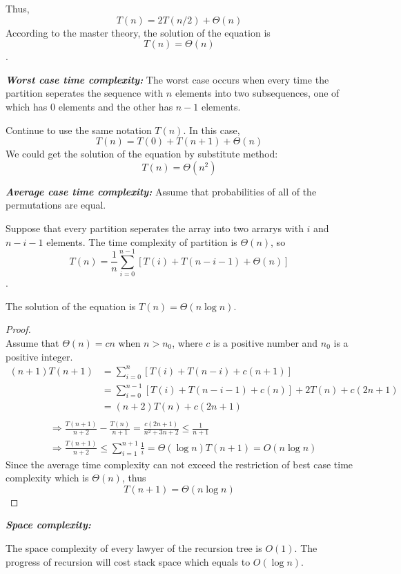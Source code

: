 \documentclass[12pt,a4paper]{article}
\theoremstyle{definition}
\begin{document}
\begin{enumerate}
\begin{enumerate}
Thus, 
$$T(n)=2T(n/2)+\Theta(n)$$ 
According to the master theory, the solution of the equation is $$T(n)=\Theta(n)$$.


\textbf{\textit{Worst case time complexity:}} The worst  case occurs when every time the partition seperates the sequence with $n$ elements into two subsequences, one of which has $0$ elements and the other has $n-1$ elements.

Continue to use the same notation $T(n)$. In this case, 
$$T(n)=T(0)+T(n+1)+\Theta(n)$$
We could get the solution of the equation by substitute method:
$$T(n)=\Theta(n^2)$$

\textbf{\textit{Average case time complexity:}} 
Assume that probabilities of all of the permutations are equal.

Suppose that every partition seperates the array into two arrarys with $i$ and $n-i-1$ elements. The time complexity of partition is $\Theta(n)$, so 
$$T(n)=\frac{1}{n} \sum_{i=0}^{n-1} [T(i)+T(n-i-1)+\Theta(n)]$$.

The solution of the equation is $T(n)=\Theta(n \log n)$.

\begin{proof}~\\
Assume that $\Theta(n)=cn$ when $n>n_0$, where $c$ is a positive number and $n_0$ is a positive integer.
		\begin{align}
       (n+1)T(n+1) &=\sum_{i=0}^{n} [T(i)+T(n-i)+c(n+1)]\\
       & = \sum_{i=0}^{n-1}[T(i)+T(n-i-1)+c(n)]+2T(n)+c(2n+1)\\
       & = (n+2)T(n)+c(2n+1)\\
        \end{align}
       \begin{equation}
       \begin{split}
      & \Rightarrow
       \frac{T(n+1)}{n+2}-\frac{T(n)}{n+1}=\frac{c(2n+1)}{n^2+3n+2}\leq \frac{1}{n+1}
       \\
      & \Rightarrow
       \frac{T(n+1)}{n+2}\leq \sum_{i=1}^{n+1} \frac{1}{i} =\Theta(\log n)
       T(n+1)=O(n\log n)
	   \end{split}       
       \end{equation}
      Since the average time complexity can not exceed the restriction of best case time complexity which is $\Theta(n)$, thus$$T(n+1)=\Theta(n\log n)$$\end{proof}
\textbf{\textit{Space complexity:}}

The space complexity of every lawyer of the recursion tree is $O(1)$. The progress of recursion will cost stack space which equals to $O(\log n)$. 


\end{enumerate}
\end{enumerate}
\end{document}
